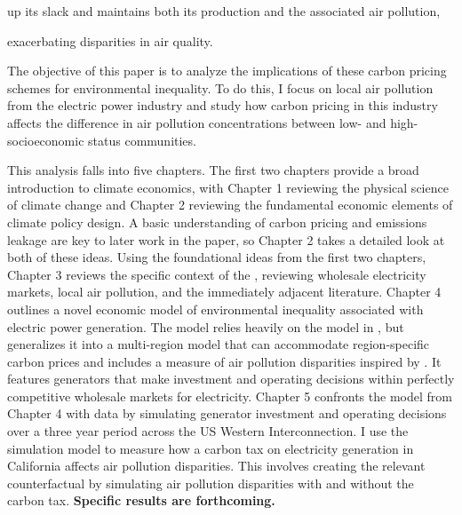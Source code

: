 up its slack and maintains both its production and the associated air pollution, 


exacerbating disparities in air quality.


The objective of this paper is to analyze the implications of these carbon pricing schemes for environmental inequality. To do this, I focus on local air pollution from the electric power industry and study how carbon pricing in this industry affects the difference in air pollution concentrations between low- and high-socioeconomic status communities. 

This analysis falls into five chapters. The first two chapters provide a broad introduction to climate economics, with Chapter 1 reviewing the physical science of climate change and Chapter 2 reviewing the fundamental economic elements of climate policy design. A basic understanding of carbon pricing and emissions leakage are key to later work in the paper, so Chapter 2 takes a detailed look at both of these ideas. Using the foundational ideas from the first two chapters, Chapter 3 reviews the specific context of the , reviewing wholesale electricity markets, local air pollution, and the immediately adjacent literature. Chapter 4 outlines a novel economic model of environmental inequality associated with electric power generation. The model relies heavily on the model in \cite{weber2021dynamic}, but generalizes it into a multi-region model that can accommodate region-specific carbon prices and includes a measure of air pollution disparities inspired by \cite{hernandez2023environmental}. It features generators that make investment and operating decisions within perfectly competitive wholesale markets for electricity. Chapter 5 confronts the model from Chapter 4 with data by simulating generator investment and operating decisions over a three year period across the US Western Interconnection. I use the simulation model to measure how a carbon tax on electricity generation in California affects air pollution disparities. This involves creating the relevant counterfactual by simulating air pollution disparities with and without the carbon tax. \textbf{Specific results are forthcoming.}



